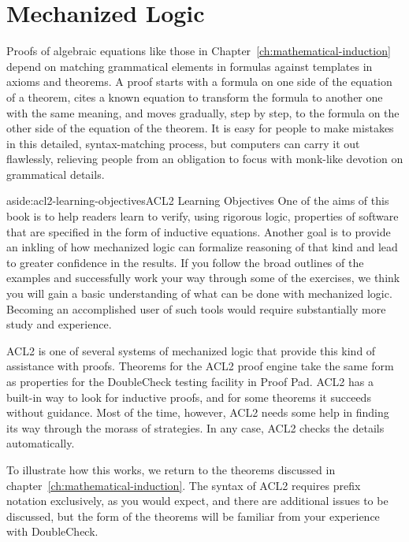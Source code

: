 \chapter{Mechanized Logic}
\label{ch:mechanized-logic}

Proofs of algebraic equations
like those in Chapter~\ref{ch:mathematical-induction}
depend on matching grammatical elements in formulas
against templates in axioms and theorems.
A proof starts with a formula on one side
of the equation of a theorem,
cites a known equation to transform the formula
to another one with the same meaning,
and moves gradually, step by step, to the formula
on the other side of the equation of the theorem.
It is easy for people to make mistakes
in this detailed, syntax-matching process,
but computers can carry it out flawlessly,
relieving people from an obligation to focus
with monk-like devotion on grammatical details.

\begin{aside}{aside:acl2-learning-objectives}{ACL2 Learning Objectives}
One of the aims of this book is to help readers learn to
verify, using rigorous logic, properties of software
that are specified in the form of inductive equations.
Another goal is to provide
an inkling of how mechanized logic
can formalize reasoning of that kind
and lead to greater confidence in the results.
If you follow the broad outlines of the examples
and successfully work your way through some of the exercises,
we think you will gain a basic understanding
of what can be done with mechanized logic.
Becoming an accomplished user of such tools
would require substantially more study and experience.
\end{aside}

ACL2 is one of several systems of
mechanized logic
that provide this kind of assistance with proofs.
Theorems for the ACL2 proof engine take the same form
as properties for the DoubleCheck testing facility in Proof Pad.
ACL2 has a built-in way to look for inductive proofs,
and for some theorems it succeeds without guidance.
Most of the time, however, ACL2 needs some help in
finding its way through the morass of strategies.
In any case, ACL2 checks the details automatically.

To illustrate how this works, we return to the theorems
discussed in chapter~\ref{ch:mathematical-induction}.
The syntax of ACL2 requires prefix notation exclusively,
as you would expect, and there are additional issues
to be discussed, but the form of the theorems
will be familiar from your experience with DoubleCheck.

